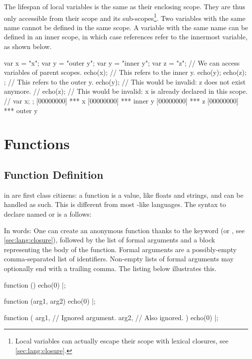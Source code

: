 The lifespan of local variables is the same as their enclosing scope. They
are thus only accessible from their scope and its
sub-scopes\footnote{Local variables can actually escape their scope
  with lexical closures, see \autoref{sec:lang:closure}.}. Two
variables with the same name cannot be defined in the same scope. A
variable with the same name can be defined in an inner scope, in which
case references refer to the innermost variable, as shown below.

\begin{urbiscript}
{
  var x = "x";
  var y = "outer y";
  {
    var y = "inner y";
    var z = "z";
    // We can access variables of parent scopes.
    echo(x);
    // This refers to the inner y.
    echo(y);
    echo(z);
  };
  // This refers to the outer y.
  echo(y);
  // This would be invalid: z does not exist anymore.
  // echo(z);
  // This would be invalid: x is already declared in this scope.
  // var x;
};
[00000000] *** x
[00000000] *** inner y
[00000000] *** z
[00000000] *** outer y
\end{urbiscript}


\section{Functions}

\subsection{Function Definition}
\label{sec:lang:function}
 in \us are first class citizens: a function is a value, like
floats and strings, and can be handled as such.  This is different from most
\langC-like languages.  The syntax to declare named or  is a follows:


In words: One can create an anonymous function thanks to the
 keyword (or , see
\autoref{sec:lang:closure}), followed by the list of formal arguments and a
block representing the body of the function.  Formal arguments are a
possibly-empty comma-separated list of identifiers.  Non-empty lists of
formal arguments may optionally end with a trailing comma. The listing below
illustrates this.

\begin{urbiscript}
function () { echo(0) }|;

function (arg1, arg2) { echo(0) }|;

function (
           arg1, // Ignored argument.
           arg2, // Also ignored.
          )
{
  echo(0)
}|;
\end{urbiscript}

